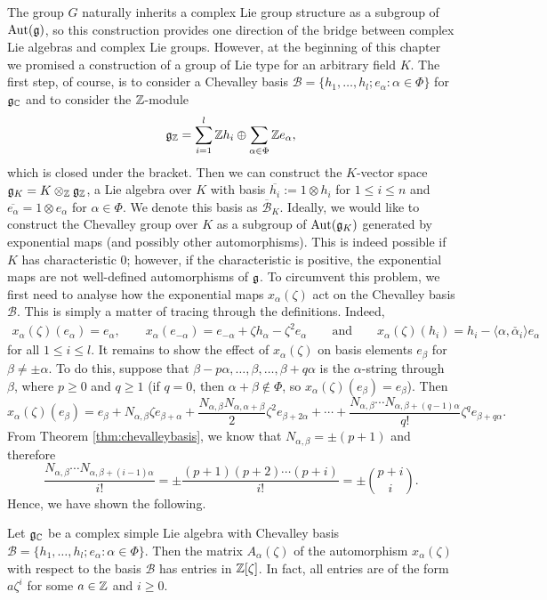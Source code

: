 The group $G$ naturally inherits a complex Lie group structure as a subgroup of $\mathrm{Aut}(\mathfrak{g})$, so this construction provides one direction of the bridge between complex Lie algebras and complex Lie groups. However, at the beginning of this chapter we promised a construction of a group of Lie type for an arbitrary field $K$. The first step, of course, is to consider a Chevalley basis $\mathcal{B}=\{h_1,\ldots,h_l;e_\alpha:\alpha\in\Phi\}$ for $\mathfrak{g}_{\mathbb{C}}$ and to consider the $\mathbb{Z}$-module 
$$\mathfrak{g}_{\mathbb{Z}}=\sum_{i=1}^l\mathbb{Z} h_i\oplus\sum_{\alpha\in\Phi}\mathbb{Z} e_\alpha,$$
which is closed under the bracket. Then we can construct the $K$-vector space $\mathfrak{g}_K=K\otimes_{\mathbb{Z}}\mathfrak{g}_{\mathbb{Z}}$, a Lie algebra over $K$ with basis $\overline{h_i}:=1\otimes h_i$ for $1\leq i\leq n$ and $\overline{e_\alpha}=1\otimes e_\alpha$ for $\alpha\in\Phi$. We denote this basis as $\overline{\mathcal{B}}_K$. Ideally, we would like to construct the Chevalley group over $K$ as a subgroup of $\mathrm{Aut}(\mathfrak{g}_K)$ generated by exponential maps (and possibly other automorphisms). This is indeed possible if $K$ has characteristic $0$; however, if the characteristic is positive, the exponential maps are not well-defined automorphisms of $\mathfrak{g}$. To circumvent this problem, we first need to analyse how the exponential maps $x_\alpha(\zeta)$ act on the Chevalley basis $\mathcal{B}$. This is simply a matter of tracing through the definitions. Indeed, 
\begin{align*}
    x_\alpha(\zeta)(e_\alpha)=e_\alpha, \quad\quad x_\alpha(e_{-\alpha})=e_{-\alpha}+\zeta h_\alpha-\zeta^2 e_\alpha\quad\quad\text{and}\quad\quad x_\alpha(\zeta)(h_i)=h_i-\langle\alpha,\check{\alpha_i}\rangle e_\alpha
\end{align*}
for all $1\leq i\leq l$. It remains to show the effect of $x_\alpha(\zeta)$ on basis elements $e_\beta$ for $\beta\neq\pm\alpha$. To do this, suppose that $\beta-p\alpha,\ldots,\beta,\ldots,\beta+q\alpha$ is the $\alpha$-string through $\beta$, where $p\geq 0$ and $q\geq 1$ (if $q=0$, then $\alpha+\beta\notin\Phi$, so $x_\alpha(\zeta)(e_\beta)=e_\beta$). Then
$$x_\alpha(\zeta)(e_\beta)=e_\beta+N_{\alpha,\beta}\zeta e_{\beta+\alpha}+\frac{N_{\alpha,\beta}N_{\alpha,\alpha+\beta}}{2}\zeta^2 e_{\beta+2\alpha}+\cdots+\frac{N_{\alpha,\beta}\cdots N_{\alpha,\beta+(q-1)\alpha}}{q!}\zeta^q e_{\beta+q\alpha}.$$
From Theorem \ref{thm:chevalleybasis}, we know that $N_{\alpha,\beta}=\pm(p+1)$ and therefore
$$\frac{N_{\alpha,\beta}\cdots N_{\alpha,\beta+(i-1)\alpha}}{i!}=\pm\frac{(p+1)(p+2)\cdots(p+i)}{i!}=\pm \binom{p+i}{i}.$$
Hence, we have shown the following.
\begin{proposition}
    Let $\mathfrak{g}_{\mathbb{C}}$ be a complex simple Lie algebra with Chevalley basis $\mathcal{B}=\{h_1,\ldots,h_l;e_\alpha:\alpha\in\Phi\}$. Then the matrix $A_\alpha(\zeta)$ of the automorphism $x_\alpha(\zeta)$ with respect to the basis $\mathcal{B}$ has entries in $\mathbb{Z}[\zeta]$. In fact, all entries are of the form $a\zeta^i$ for some $a\in\mathbb{Z}$ and $i\geq0$. 
\end{proposition}

